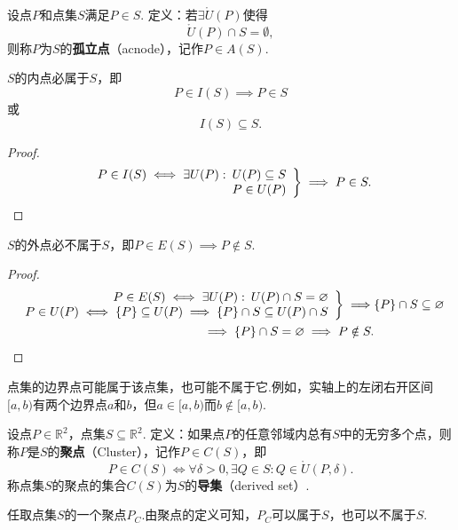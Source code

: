 \begin{definition}
设点\(P\)和点集\(S\)满足\(P \in S\).
定义：若\(\exists \mathring{U}(P)\)使得\[
\mathring{U}(P) \cap S = \emptyset,
\]则称\(P\)为\(S\)的\textbf{孤立点}（acnode），记作\(P \in A(S)\).
\end{definition}

\begin{property}
\(S\)的内点必属于\(S\)，即\[
P \in I(S) \implies P \in S
\]或\[
I(S) \subseteq S.
\]
\begin{proof}
\[
\left. \begin{array}{r}
P \in I(S) \iff \exists U(P) :\: U(P) \subseteq S \\
P \in U(P)
\end{array} \right\}
\implies P \in S.
\qedhere
\]
\end{proof}
\end{property}

\begin{property}
\(S\)的外点必不属于\(S\)，即\(P \in E(S) \implies P \notin S\).
\begin{proof}
\begin{align*}
\left. \begin{array}{r}
P \in E(S) \iff \exists U(P) :\: U(P) \cap S = \emptyset \\
P \in U(P) \iff \{P\} \subseteq U(P) \implies \{P\} \cap S \subseteq U(P) \cap S
\end{array} \right\}
\implies& \{P\} \cap S \subseteq \emptyset \\
\implies \{P\} \cap S = \emptyset
\implies P \notin S.&
\qedhere
\end{align*}
\end{proof}
\end{property}

\begin{example}
点集的边界点可能属于该点集，也可能不属于它.例如，实轴上的左闭右开区间\([a,b)\)有两个边界点\(a\)和\(b\)，但\(a \in [a,b)\)而\(b \notin [a,b)\).
\end{example}

\begin{definition}
设点\(P\in\mathbb{R}^2\)，点集\(S\subseteq\mathbb{R}^2\).
定义：如果点\(P\)的任意邻域内总有\(S\)中的无穷多个点，则称\(P\)是\(S\)的\textbf{聚点}（Cluster），记作\(P \in C(S)\)，即\[
P \in C(S)
\iff
\forall\delta>0,\exists Q \in S : Q \in \mathring{U}(P,\delta).
\]称点集\(S\)的聚点的集合\(C(S)\)为\(S\)的\textbf{导集}（derived set）.
\end{definition}
任取点集\(S\)的一个聚点\(P_C\).由聚点的定义可知，\(P_C\)可以属于\(S\)，也可以不属于\(S\).

